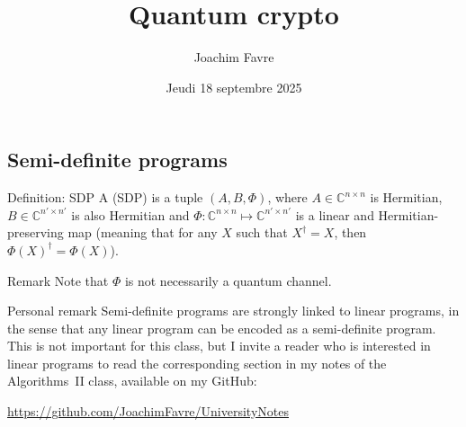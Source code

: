 \documentclass[a4paper]{article}
\title{Quantum crypto}
\author{Joachim Favre}
\date{Jeudi 18 septembre 2025}
\begin{document}
\maketitle


\subsection{Semi-definite programs}

\begin{parag}{Definition: SDP}
    A  (SDP) is a tuple $\left(A, B, \Phi\right)$, where $A \in \mathbb{C}^{n \times n}$ is Hermitian, $B \in \mathbb{C}^{n' \times n'}$ is also Hermitian and $\Phi: \mathbb{C}^{n \times n} \mapsto \mathbb{C}^{n' \times n'}$ is a linear and Hermitian-preserving map (meaning that for any $X$ such that $X^{\dagger} = X$, then $\Phi\left(X\right)^{\dagger} = \Phi\left(X\right)$).

    \begin{subparag}{Remark}
        Note that $\Phi$ is not necessarily a quantum channel.
    \end{subparag}

    \begin{subparag}{Personal remark}
        Semi-definite programs are strongly linked to linear programs, in the sense that any linear program can be encoded as a semi-definite program. This is not important for this class, but I invite a reader who is interested in linear programs to read the corresponding section in my notes of the Algorithms~II class, available on my GitHub:
        \begin{center}
            \url{https://github.com/JoachimFavre/UniversityNotes}
        \end{center}
    \end{subparag}
\end{parag}
\end{document}
